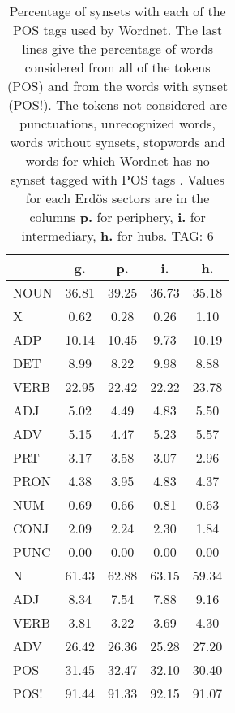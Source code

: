 \begin{table}[h!]
\begin{center}
\begin{tabular}{| l || c | c | c | c |}\hline
 & {\bf g.} & {\bf p.} & {\bf i.} & {\bf h.} \\\hline\hline
NOUN & 36.81  & 39.25  & 36.73  & 35.18 \\
X & 0.62  & 0.28  & 0.26  & 1.10 \\\hline
ADP & 10.14  & 10.45  & 9.73  & 10.19 \\
DET & 8.99  & 8.22  & 9.98  & 8.88 \\\hline
VERB & 22.95  & 22.42  & 22.22  & 23.78 \\\hline
ADJ & 5.02  & 4.49  & 4.83  & 5.50 \\
ADV & 5.15  & 4.47  & 5.23  & 5.57 \\\hline
PRT & 3.17  & 3.58  & 3.07  & 2.96 \\
PRON & 4.38  & 3.95  & 4.83  & 4.37 \\
NUM & 0.69  & 0.66  & 0.81  & 0.63 \\
CONJ & 2.09  & 2.24  & 2.30  & 1.84 \\
PUNC & 0.00  & 0.00  & 0.00  & 0.00 \\\hline\hline\hline
N & 61.43  & 62.88  & 63.15  & 59.34 \\\hline
ADJ & 8.34  & 7.54  & 7.88  & 9.16 \\\hline
VERB & 3.81  & 3.22  & 3.69  & 4.30 \\\hline
ADV & 26.42  & 26.36  & 25.28  & 27.20 \\\hline\hline
POS & 31.45  & 32.47  & 32.10  & 30.40 \\\hline
POS! & 91.44  & 91.33  & 92.15  & 91.07 \\\hline
\end{tabular}
\caption{Percentage of synsets with each of the POS tags used by Wordnet. The last lines give the percentage of words considered from all of the tokens (POS) and from the words with synset (POS!). The tokens not considered are punctuations, unrecognized words, words without synsets, stopwords and words for which Wordnet has no synset  tagged with POS tags . Values for each Erd\"os sectors are in the columns {{\bf p.}} for periphery, {{\bf i.}} for intermediary, {{\bf h.}} for hubs. TAG: 6}
\end{center}
\end{table}